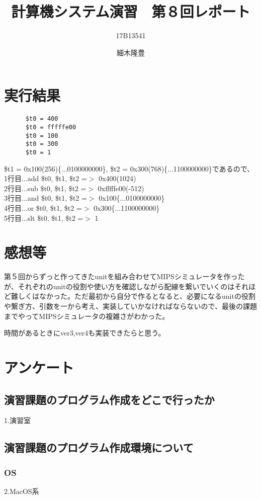 \documentclass{jarticle}
\title{計算機システム演習　第８回レポート}
\author{17B13541 \and 細木隆豊}
\date{}
\begin{document}
  \maketitle
  \section{実行結果}
    \begin{lstlisting}
      $t0 = 400
      $t0 = fffffe00
      $t0 = 100
      $t0 = 300
      $t0 = 1
    \end{lstlisting}
    \$t1 = 0x100(256)\{...0100000000\}, \$t2 = 0x300(768)\{...1100000000\}であるので、 \\
    1行目...add \$t0, \$t1, \$t2 =$>$ 0x400(1024) \\
    2行目...sub \$t0, \$t1, \$t2 =$>$ 0xfffffe00(-512) \\
    3行目...and \$t0, \$t1, \$t2 =$>$ 0x100\{...0100000000\} \\
    4行目...or  \$t0, \$t1, \$t2 =$>$ 0x300\{...1100000000\} \\
    5行目...slt \$t0, \$t1, \$t2 =$>$ 1 \\

  \section{感想等}
    第５回からずっと作ってきたunitを組み合わせてMIPSシミュレータを作ったが、それぞれのunitの役割や使い方を確認しながら配線を繋いでいくのはそれほど難しくはなかった。ただ最初から自分で作るとなると、必要になるunitの役割や繋ぎ方、引数を一から考え、実装していかなければならないので、最後の課題までやってMIPSシミュレータの複雑さがわかった。

    時間があるときにver3,ver4も実装できたらと思う。

  \section{アンケート}
    \subsection{演習課題のプログラム作成をどこで行ったか}
    1.演習室

    \subsection{演習課題のプログラム作成環境について}
      \subsubsection{OS}
      2.MacOS系
\end{document}
